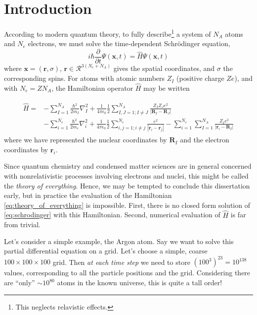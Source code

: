 \chapter{Introduction}
\label{chap:intro}

According to modern quantum theory, to fully describe\footnote{This neglects relavistic effects.} a system of $N_A$ atoms and $N_e$ electrons, we must solve the time-dependent Schr\"odinger equation,
\begin{equation}
    \label{eq:schrodinger}
    i \hbar \frac{\partial}{\partial t} \Psi(\bm{x}, t)
    = \hat{H} \Psi(\bm{x}, t)
\end{equation}
where $\bm x=(\bm{r}, \sigma)$, $\bm r\in\mathcal{R}^{3(N_e+N_A)}$ gives the spatial coordinates, and $\sigma$ the corresponding spins. For atoms with atomic numbers $Z_I$ (positive charge $Ze$), and with $N_e=ZN_A$, the Hamiltonian operator $\hat H$ may be written

\begin{align}
\begin{split}
\label{eq:theory_of_everything}
\hat H =& -\sum_{I=1}^{N_A}\frac{\hbar^2}{2m_I} \nabla^2_I
+ \frac 1{4\pi\epsilon_0} \frac 12\sum_{I,J=1;I\neq J}^{N_A} \frac{Z_IZ_Je^2}{|\bm R_I-\bm R_J|} \\
&- \sum_{i=1}^{N_e} \frac{\hbar^2}{2m_e} \nabla^2_i
+ \frac 1{4\pi\epsilon_0} \frac 12\sum_{i,j=1;i\neq j}^{N_e} \frac{e^2}{|\bm r_i-\bm r_j|}
- \sum_{i=1}^{N_e} \sum_{I=1}^{N_A} \frac{Z_I e^2}{|\bm r_i-\bm R_I|}
\end{split}
\end{align}
where we have represented the nuclear coordinates by $\bm R_I$ and the electron coordinates by $\bm r_i$.

Since quantum chemistry and condensed matter sciences are in general concerned with nonrelativistic processes involving electrons and nuclei, this might be called the \emph{theory of everything}. Hence, we may be tempted to conclude this dissertation early, but in practice the evaluation of the Hamiltonian \eqref{eq:theory_of_everything} is impossible. First, there is no closed form solution of \eqref{eq:schrodinger} with this Hamiltonian. Second, numerical evaluation of $\hat H$ is far from trivial.

Let's consider a simple example, the Argon atom. Say we want to solve this partial differential equation on a grid. Let's choose a simple, coarse $100\times 100\times 100$ grid. Then \emph{at each time step} we need to store $(100^3)^{23}=10^{138}$ values, corresponding to all the particle positions and the grid. Considering there are ``only'' $\sim 10^{80}$ atoms in the known universe,\cite{rydenIntroduction2017} this is quite a tall order!

